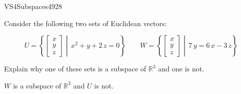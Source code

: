 \begin{exercise}{VS4}{Subspaces}{4928} 
\begin{exerciseStatement} 

Consider the following two sets of Euclidean vectors: 

 \[
          U=\left\{ \left[\begin{array}{c}
x \\
y \\
z
\end{array}\right] \middle|\,x^{2} + y + 2 \, z = 0\right\} \hspace{2em}  W=\left\{ \left[\begin{array}{c}
x \\
y \\
z
\end{array}\right] \middle|\,7 \, y = 6 \, x - 3 \, z\right\}
    \] 

 Explain why one of these sets is a subspace of \(\mathbb{R}^3\) and one is not. 

 \end{exerciseStatement}
 \begin{exerciseAnswer} 

\(W\) is a subspace of \(\mathbb{R}^3\) and \(U\) is not.

 \end{exerciseAnswer}
 \end{exercise}


